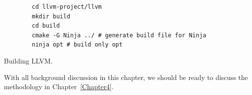 \begin{listing}[h!]
    \begin{verbatim}
        cd llvm-project/llvm
        mkdir build
        cd build
        cmake -G Ninja ../ # generate build file for Ninja
        ninja opt # build only opt
    \end{verbatim}
    \caption{Building LLVM.}    
    \label{listing:build-llvm}
    \vspace{128cm} %
\end{listing}


With all background discussion in this chapter, we should be ready to discuss
the methodology in Chapter~\ref{Chapter4}.